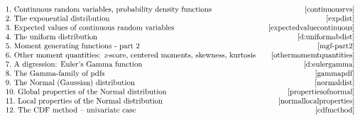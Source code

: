 \documentclass[12pt]{article}
\begin{document}
$
\begin{array}{lr}
1.\mbox{ Continuous random variables, probability density functions}\ \ \  & \pageref{continuousrvs} \\
2.\mbox{ The exponential distribution} & \pageref{expdist}\\
3.\mbox{ Expected values of continuous random variables} & \pageref{expectedvaluecontinuous}\\
4.\mbox{ The uniform distribution} & \pageref{d:uniformabdist}\\
5.\mbox{ Moment generating functions - part 2} & \pageref{mgf-part2}\\
6.\mbox{ Other moment quantities: {\em z}-score, centered moments, skewness, kurtosis} \ \ & \pageref{othermomemtquantities}\\
7.\mbox{ A digression: Euler's Gamma function} & \pageref{d:eulergamma}\\
8.\mbox{ The Gamma-family of pdfs} & \pageref{gammapdf}\\
9.\mbox{ The Normal (Gaussian) distribution} & \pageref{normaldist}\\
10.\mbox{ Global properties of the Normal distribution} & \pageref{propertiesofnormal}\\
11.\mbox{ Local properties of the Normal distribution} & \pageref{normallocalproperties}\\
12.\mbox{ The CDF method -- univariate case} & \pageref{cdfmethod}\\
\end{array}$

\newpage


\end{document}
